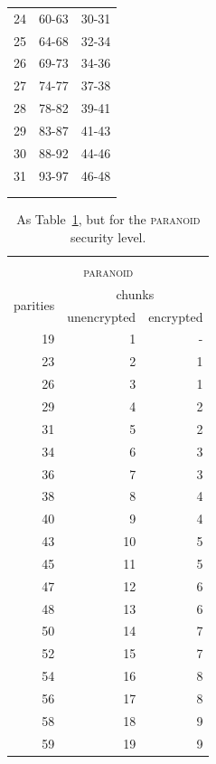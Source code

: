 \documentclass[manuscript,screen,review]{acmart}
\begin{document}
\begin{table}[!ht]
\begin{minipage}{.49\linewidth}
\begin{tabular}{|r|r|r|}
24 & 60-63 & 30-31\\
25 & 64-68 & 32-34\\
26 & 69-73 & 34-36\\
27 & 74-77 & 37-38\\
28 & 78-82 & 39-41\\
29 & 83-87 & 41-43\\
30 & 88-92 & 44-46\\
31 & 93-97 & 46-48\\
\hline
\multicolumn{3}{c}{}\\
\multicolumn{3}{c}{}
\end{tabular}
\end{minipage}
\label{tbl:parities}
\end{table}


\begin{table}[!ht]
\Description[]{}\caption{As Table~\ref{tbl:parities}, but for the \textsc{paranoid} security level.}
\begin{minipage}{.49\linewidth}
\centering
\begin{tabular}{|r|r|r|}
\multicolumn{3}{c}{\textsc{}}\\
\multicolumn{3}{c}{\textsc{paranoid}}\\\hline
\multirow{2}{1.5cm}{\centering 
 parities } 
&\multicolumn{2}{|c|}{ chunks }\\\cline{2-3}
&\multicolumn{1}{|c|}{unencrypted} 
&\multicolumn{1}{|c|}{encrypted} \\\hline\hline
19 & 1 & -\\
23 & 2  & 1\\
26 & 3  & 1\\
29 & 4  & 2\\
31 & 5  & 2\\
34 & 6  & 3\\
36 & 7  & 3\\
38 & 8  & 4\\
40 & 9  & 4\\
43 & 10 & 5\\
45 & 11 & 5\\
47 & 12 & 6\\
48 & 13 & 6\\
50 & 14 & 7\\
52 & 15 & 7\\
54 & 16 & 8\\
56 & 17 & 8\\
58 & 18 & 9\\
59 & 19 & 9\\
\hline
\end{tabular}

\end{minipage}
\end{table}
\end{document}
